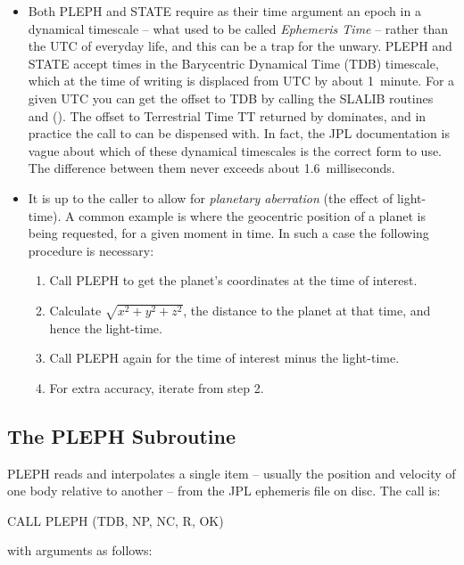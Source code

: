 \documentclass[twoside,11pt,nolof]{starlink}
\begin{document}
\begin{itemize}

\item Both PLEPH and STATE require as their time argument an epoch in a
dynamical timescale -- what used to be called \textit{Ephemeris Time}\/
-- rather than the UTC of everyday life, and this can be a trap for
the unwary.  PLEPH and STATE accept times in the Barycentric Dynamical
Time (TDB) timescale, which at the time of writing is displaced from
UTC by about 1~minute.  For a given UTC you can get the offset to TDB
by calling the SLALIB routines
 and
().
The offset to Terrestrial Time TT returned by
dominates, and in practice the call to
can be dispensed with.  In fact, the JPL documentation is vague
about which of these dynamical timescales is the correct form to use.
The difference between them never exceeds about 1.6~milliseconds.

\item It is up to the caller to allow for \textit{planetary aberration}\/
(the effect of light-time).  A common example is where the geocentric
position of a planet is being requested, for a given moment in time.
In such a case the following procedure is necessary:

\begin{enumerate}
\item Call PLEPH to get the planet's coordinates
at the time of interest.
\item Calculate $\sqrt{x^{2}+y^{2}+z^{2}}$,
the distance to the planet at that time,
and hence the light-time.
\item Call PLEPH again for the time of interest minus the
light-time.
\item For extra accuracy, iterate from step 2.
\end{enumerate}
\end{itemize}

\subsection{The PLEPH Subroutine}
\label{the_pleph_subroutine}

PLEPH reads and interpolates a single item --
usually the position and velocity
of one body relative to another --
from the JPL ephemeris file on disc.
The call is:
\begin{terminalv}
CALL PLEPH (TDB, NP, NC, R, OK)
\end{terminalv}
with arguments as follows:
\end{document}
